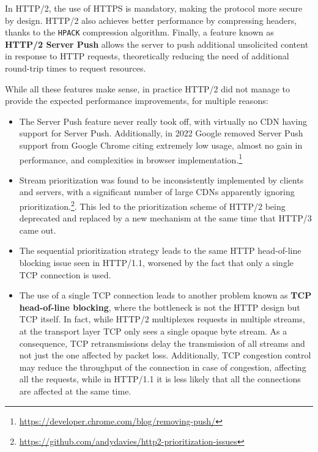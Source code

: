 
In HTTP/2, the use of HTTPS is mandatory, making the protocol more secure by design. HTTP/2 also achieves better performance by compressing headers, thanks to the \texttt{HPACK} compression algorithm. Finally, a feature known as \textbf{HTTP/2 Server Push} allows the server to push additional unsolicited content in response to HTTP requests, theoretically reducing the need of additional round-trip times to request resources.

While all these features make sense, in practice HTTP/2 did not manage to provide the expected performance improvements, for multiple reasons:

\begin{itemize}
    \item The Server Push feature never really took off, with virtually no CDN having support for Server Push. Additionally, in 2022 Google removed Server Push support from Google Chrome citing extremely low usage, almost no gain in performance, and complexities in browser implementation.\footnote{\url{https://developer.chrome.com/blog/removing-push/}}
    \item Stream prioritization was found to be inconsistently implemented by clients and servers, with a significant number of large CDNs apparently ignoring prioritization.\footnote{\url{https://github.com/andydavies/http2-prioritization-issues}}. This led to the prioritization scheme of HTTP/2 being deprecated and replaced by a new mechanism at the same time that HTTP/3 came out.
    \item The sequential prioritization strategy leads to the same HTTP head-of-line blocking issue seen in HTTP/1.1, worsened by the fact that only a single TCP connection is used.
    \item The use of a single TCP connection leads to another problem known as \textbf{TCP head-of-line blocking}, where the bottleneck is not the HTTP design but TCP itself. In fact, while HTTP/2 multiplexes requests in multiple streams, at the transport layer TCP only sees a single opaque byte stream. As a consequence, TCP retransmissions delay the transmission of all streams and not just the one affected by packet loss. Additionally, TCP congestion control may reduce the throughput of the connection in case of congestion, affecting all the requests, while in HTTP/1.1 it is less likely that all the connections are affected at the same time.
\end{itemize}


